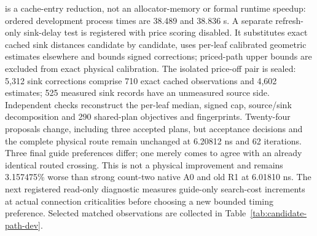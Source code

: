 \documentclass[conference,10pt]{IEEEtran}
\begin{document}
is a cache-entry reduction, not an allocator-memory or formal runtime speedup: ordered development process times are 38.489 and 38.836 s. A separate refresh-only sink-delay test is registered with price scoring disabled. It substitutes exact cached sink distances candidate by candidate, uses per-leaf calibrated geometric estimates elsewhere and bounds signed corrections; priced-path upper bounds are excluded from exact physical calibration. The isolated price-off pair is sealed: 5,312 sink corrections comprise 710 exact cached observations and 4,602 estimates; 525 measured sink records have an unmeasured source side. Independent checks reconstruct the per-leaf median, signed cap, source/sink decomposition and 290 shared-plan objectives and fingerprints. Twenty-four proposals change, including three accepted plans, but acceptance decisions and the complete physical route remain unchanged at 6.20812 ns and 62 iterations. Three final guide preferences differ; one merely comes to agree with an already identical routed crossing. This is not a physical improvement and remains 3.157475\% worse than strong count-two native A0 and old R1 at 6.01810 ns. The next registered read-only diagnostic measures guide-only search-cost increments at actual connection criticalities before choosing a new bounded timing preference. Selected matched observations are collected in Table~\ref{tab:candidate-path-dev}.

\end{document}
